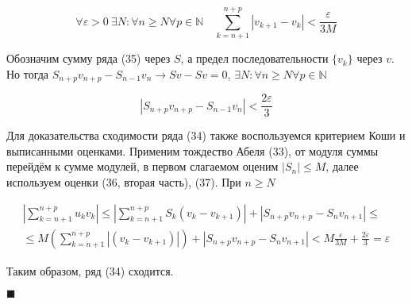 \begin{enumerate}
	\begin{equation*}
		\forall \varepsilon > 0\ \exists N \colon \forall n \geqslant N \forall p \in \mathbb{N} \quad \displaystyle\sum_{k = n + 1}^{n + p} |v_{k + 1} - v_k| < \frac{\varepsilon}{3M}
	\end{equation*}
	
	Обозначим сумму ряда (35) через $S$, а предел последовательности $\{v_k\}$ через $v$. Но тогда $S_{n + p}v_{n + p} - S_{n - 1}v_n \rightarrow Sv - Sv = 0$, $\exists N \colon \forall n \geqslant N \forall p \in \mathbb{N}$
	
	\begin{equation}
		|S_{n + p}v_{n + p} - S_{n - 1}v_n| < \frac{2\varepsilon}{3}
	\end{equation}
	
	Для доказательства сходимости ряда (34) также воспользуемся критерием Коши и выписанными оценками. Применим тождество Абеля (33), от модуля суммы перейдём к сумме модулей, в первом слагаемом оценим $|S_n| \leqslant M$, далее используем оценки (36, вторая часть), (37). При $n \geqslant N$
	
	\begin{equation*}
		\begin{gathered}
			\left| \displaystyle\sum_{k = n + 1}^{n + p} u_kv_k \right| \leqslant \left| \displaystyle\sum_{k = n + 1}^{n + p} S_k(v_k - v_{k + 1}) \right| + |S_{n + p}v_{n + p} - S_nv_{n + 1}| \leqslant \\
			\leqslant M\left( \displaystyle\sum_{k = n + 1}^{n + p} |(v_k - v_{k + 1})| \right) + |S_{n + p}v_{n + p} - S_nv_{n + 1}| < M\frac{\varepsilon}{3M} + \frac{2\varepsilon}{3} = \varepsilon
		\end{gathered}
	\end{equation*}
	
	Таким образом, ряд (34) сходится.
\end{enumerate}

\begin{flushright}
	$\blacksquare$
\end{flushright}